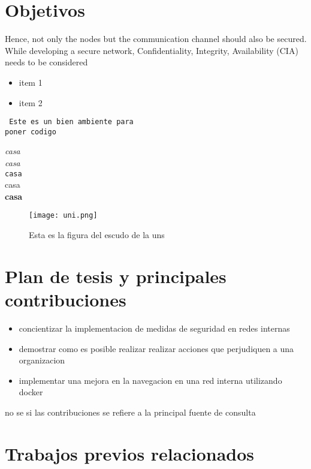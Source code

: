 %



\section{Objetivos}

Hence, not only the nodes but the communication channel should also be secured.
While developing a secure network, Confidentiality, Integrity, Availability (CIA)
needs to be considered

\begin{itemize}
 \item item 1
 \item item 2
\end{itemize}


\begin{verbatim}
 Este es un bien ambiente para 
poner codigo
\end{verbatim}




\textit{casa} \\
\emph{casa} \\
\texttt{casa} \\
\textsf{casa} \\
\textbf{casa} \\

\begin{center}
\begin{figure}

\begin{center}
    \texttt{[image: uni.png]}
\end{center}

\caption{Esta es la figura del escudo de la uns}
\end{figure}
\end{center}

\section{Plan de tesis y principales contribuciones}\label{secContribuciones}
\begin{itemize}
    \item concientizar la implementacion de medidas de seguridad en redes internas
    \item demostrar como es posible realizar realizar acciones que perjudiquen a una organizacion
    \item implementar una mejora en la navegacion en una red interna utilizando docker
   \end{itemize}
   no se si las contribuciones se refiere a la principal fuente de consulta
\section{Trabajos previos relacionados}

